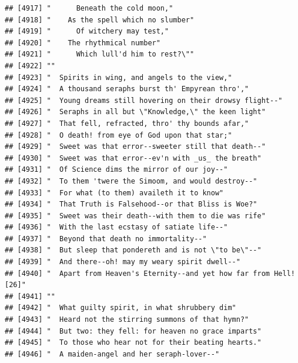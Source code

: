 \documentclass{article}\usepackage[]{graphicx}\usepackage[]{color}
\makeatletter
\newenvironment{kframe}{%
 \def\at@end@of@kframe{}%
 \ifinner\ifhmode%
  \def\at@end@of@kframe{\end{minipage}}%
  \begin{minipage}{\columnwidth}%
 \fi\fi%
 \def\FrameCommand##1{\hskip\@totalleftmargin \hskip-\fboxsep
 \colorbox{shadecolor}{##1}\hskip-\fboxsep
     \hskip-\linewidth \hskip-\@totalleftmargin \hskip\columnwidth}%
 \MakeFramed {\advance\hsize-\width
   \@totalleftmargin\z@ \linewidth\hsize
   \@setminipage}}%
 {\par\unskip\endMakeFramed%
 \at@end@of@kframe}
\newenvironment{knitrout}{}{} %
\makeatother
\begin{document}
\begin{knitrout}
\begin{kframe}
\begin{verbatim}
## [4917] "      Beneath the cold moon,"                                                
## [4918] "    As the spell which no slumber"                                           
## [4919] "      Of witchery may test,"                                                 
## [4920] "    The rhythmical number"                                                   
## [4921] "      Which lull'd him to rest?\""                                           
## [4922] ""                                                                            
## [4923] "  Spirits in wing, and angels to the view,"                                  
## [4924] "  A thousand seraphs burst th' Empyrean thro',"                              
## [4925] "  Young dreams still hovering on their drowsy flight--"                      
## [4926] "  Seraphs in all but \"Knowledge,\" the keen light"                          
## [4927] "  That fell, refracted, thro' thy bounds afar,"                              
## [4928] "  O death! from eye of God upon that star;"                                  
## [4929] "  Sweet was that error--sweeter still that death--"                          
## [4930] "  Sweet was that error--ev'n with _us_ the breath"                           
## [4931] "  Of Science dims the mirror of our joy--"                                   
## [4932] "  To them 'twere the Simoom, and would destroy--"                            
## [4933] "  For what (to them) availeth it to know"                                    
## [4934] "  That Truth is Falsehood--or that Bliss is Woe?"                            
## [4935] "  Sweet was their death--with them to die was rife"                          
## [4936] "  With the last ecstasy of satiate life--"                                   
## [4937] "  Beyond that death no immortality--"                                        
## [4938] "  But sleep that pondereth and is not \"to be\"--"                           
## [4939] "  And there--oh! may my weary spirit dwell--"                                
## [4940] "  Apart from Heaven's Eternity--and yet how far from Hell! [26]"             
## [4941] ""                                                                            
## [4942] "  What guilty spirit, in what shrubbery dim"                                 
## [4943] "  Heard not the stirring summons of that hymn?"                              
## [4944] "  But two: they fell: for heaven no grace imparts"                           
## [4945] "  To those who hear not for their beating hearts."                           
## [4946] "  A maiden-angel and her seraph-lover--"                                     

\end{verbatim}
\end{kframe}
\end{knitrout}
\end{document}
